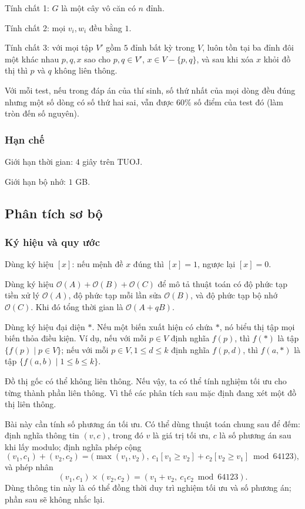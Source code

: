\documentclass[11pt]{article}
\newcommand{\Oh}{\mathcal{O}}
\begin{document}
Tính chất 1: \(G\) là một cây vô căn có \(n\) đỉnh.

Tính chất 2: mọi \(v_i,w_i\) đều bằng \(1\).

Tính chất 3: với mọi tập \(V'\) gồm \(5\) đỉnh bất kỳ trong \(V\), luôn tồn tại
ba đỉnh đôi một khác nhau \(p,q,x\) sao cho \(p,q\in V'\),
\(x\in V-\{p,q\}\), và sau khi xóa \(x\) khỏi đồ thị thì \(p\) và \(q\) không
liên thông.

Với mỗi test, nếu trong đáp án của thí sinh, số thứ nhất của mọi dòng đều đúng
nhưng một số dòng có số thứ hai sai, vẫn được \(60\%\) số điểm của test đó
(làm tròn đến số nguyên).

\subsubsection{Hạn chế}

Giới hạn thời gian: \(4\) giây trên TUOJ.

Giới hạn bộ nhớ: \(1\) GB.

\subsection{Phân tích sơ bộ}

\subsubsection{Ký hiệu và quy ước}

Dùng ký hiệu \([x]\): nếu mệnh đề \(x\) đúng thì \([x]=1\), ngược lại
\([x]=0\).

Dùng ký hiệu \(\Oh(A)+\Oh(B)+\Oh(C)\) để mô tả thuật toán có độ phức tạp tiền
xử lý \(\Oh(A)\), độ phức tạp mỗi lần sửa \(\Oh(B)\), và độ phức tạp bộ nhớ
\(\Oh(C)\). Khi đó tổng thời gian là \(\Oh(A+qB)\).

Dùng ký hiệu đại diện \(*\). Nếu một biến xuất hiện có chứa \(*\), nó biểu thị
tập mọi biến thỏa điều kiện. Ví dụ, nếu với mỗi \(p\in V\) định nghĩa
\(f(p)\), thì \(f(*)\) là tập \(\{f(p)\mid p\in V\}\); nếu với mỗi
\(p\in V,1\le d\le k\) định nghĩa \(f(p,d)\), thì \(f(a,*)\) là tập
\(\{f(a,b)\mid 1\le b\le k\}\).

Đồ thị gốc có thể không liên thông. Nếu vậy, ta có thể tính nghiệm tối ưu cho
từng thành phần liên thông. Vì thế các phân tích sau mặc định đang xét một đồ
thị liên thông.

Bài này cần tính số phương án tối ưu. Có thể dùng thuật toán chung sau để đếm:
định nghĩa thông tin \((v,c)\), trong đó \(v\) là giá trị tối ưu, \(c\) là số
phương án sau khi lấy modulo; định nghĩa phép cộng
\[
  (v_1,c_1)+(v_2,c_2)=
  \bigl(\max(v_1,v_2),\ c_1[v_1\ge v_2]+c_2[v_2\ge v_1]\bmod 64123\bigr),
\]
và phép nhân
\[
  (v_1,c_1)\times(v_2,c_2)=(v_1+v_2,\ c_1c_2\bmod 64123).
\]
Dùng thông tin này là có thể đồng thời duy trì nghiệm tối ưu và số phương án;
phần sau sẽ không nhắc lại.
\end{document}
